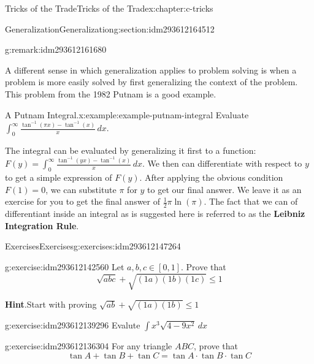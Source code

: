 \documentclass[twoside,10pt,]{book}
\newcommand{\blocktitlefont}{\relax}
\newcommand{\terminology}[1]{\textbf{#1}}
\numberwithin{equation}{section}
\begin{document}
\begin{chapterptx}{Tricks of the Trade}{}{Tricks of the Trade}{}{}{x:chapter:c-tricks}
\begin{sectionptx}{Generalization}{}{Generalization}{}{}{g:section:idm293612164512}
\begin{remark}{}{g:remark:idm293612161680}
\end{remark}
A different sense in which generalization applies to problem solving is when a problem is more easily solved by first generalizing the context of the problem.  This problem from the 1982 Putnam is a good example.%
\begin{example}{A Putnam Integral.}{x:example:example-putnam-integral}%
%
Evaluate \(\int_0^{\infty} \frac{\tan^{-1}(\pi  x)-\tan^{-1}(x)}{x} \, dx\).%
\par
The integral can be evaluated by generalizing it first to a function: \(F(y)=\int_0^{\infty} \frac{\tan ^{-1}(y x)-\tan ^{-1}(x)}{x} \, dx\). We then can differentiate with respect to \(y\) to get a simple expression of \(F(y)\).  After applying the obvious condition \(F(1)=0\), we can substitute \(\pi\) for \(y\) to get our final answer.  We leave it as an exercise for you to get the final answer of \(\frac{1}{2} \pi  \ln(\pi )\).   The fact that we can of differentiant inside an integral as is suggested here is referred to as the \terminology{Leibniz Integration Rule}.%
\end{example}
\end{sectionptx}
%
%
\typeout{************************************************}
\typeout{************************************************}
%
\begin{exercises-section}{Exercises}{}{Exercises}{}{}{g:exercises:idm293612147264}
\begin{divisionexercise}{1}{}{}{g:exercise:idm293612142560}%
Let \(a, b, c \in [0, 1]\). Prove that%
\begin{equation*}
\sqrt{a b c}+ \sqrt{(1a)(1b)(1c)} \leq 1
\end{equation*}
%
\par\smallskip%
\noindent\textbf{\blocktitlefont Hint}.\label{g:hint:idm293612141072}{}\hypertarget{g:hint:idm293612141072}{}\quad{}Start with proving  \(\sqrt{a b}+ \sqrt{(1a)(1b)} \leq 1\)%
\end{divisionexercise}%
\begin{divisionexercise}{2}{}{}{g:exercise:idm293612139296}%
Evalute \(\int x^3 \sqrt{4-9x^2} \, dx\)%
\end{divisionexercise}%
\begin{divisionexercise}{3}{}{}{g:exercise:idm293612136304}%
For any triangle \(ABC\), prove that%
\begin{equation*}
\tan{A}+\tan{B}+\tan{C} = \tan{A}\cdot \tan{B}\cdot \tan{C}
\end{equation*}

\end{divisionexercise}
\end{exercises-section}
\end{chapterptx}
\end{document}
